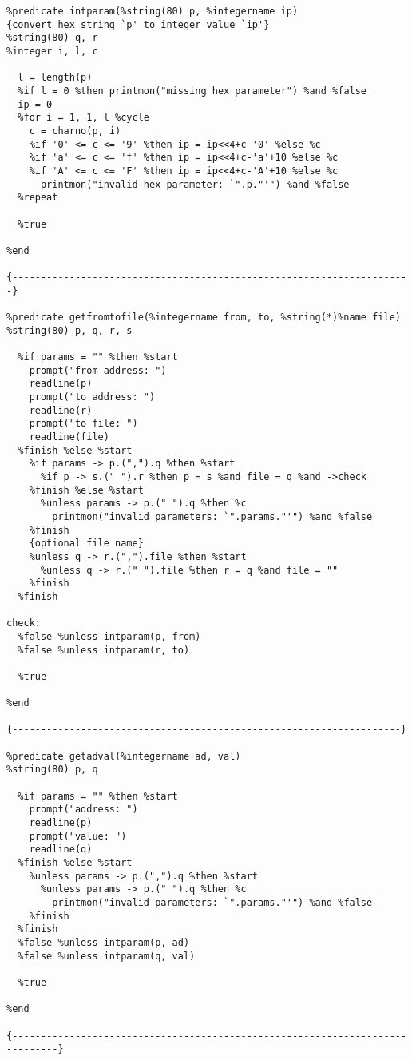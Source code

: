 \begin{verbatim}
%predicate intparam(%string(80) p, %integername ip)
{convert hex string `p' to integer value `ip'}
%string(80) q, r
%integer i, l, c

  l = length(p)
  %if l = 0 %then printmon("missing hex parameter") %and %false
  ip = 0
  %for i = 1, 1, l %cycle
    c = charno(p, i)    
    %if '0' <= c <= '9' %then ip = ip<<4+c-'0' %else %c
    %if 'a' <= c <= 'f' %then ip = ip<<4+c-'a'+10 %else %c
    %if 'A' <= c <= 'F' %then ip = ip<<4+c-'A'+10 %else %c
      printmon("invalid hex parameter: `".p."'") %and %false
  %repeat

  %true

%end

{----------------------------------------------------------------------}

%predicate getfromtofile(%integername from, to, %string(*)%name file)
%string(80) p, q, r, s

  %if params = "" %then %start
    prompt("from address: ")
    readline(p)
    prompt("to address: ")
    readline(r)
    prompt("to file: ")
    readline(file)
  %finish %else %start
    %if params -> p.(",").q %then %start
      %if p -> s.(" ").r %then p = s %and file = q %and ->check
    %finish %else %start
      %unless params -> p.(" ").q %then %c
        printmon("invalid parameters: `".params."'") %and %false
    %finish
    {optional file name}
    %unless q -> r.(",").file %then %start
      %unless q -> r.(" ").file %then r = q %and file = ""
    %finish
  %finish

check:
  %false %unless intparam(p, from)
  %false %unless intparam(r, to)

  %true

%end

{--------------------------------------------------------------------}

%predicate getadval(%integername ad, val)
%string(80) p, q

  %if params = "" %then %start
    prompt("address: ")
    readline(p)
    prompt("value: ")
    readline(q)
  %finish %else %start
    %unless params -> p.(",").q %then %start
      %unless params -> p.(" ").q %then %c
        printmon("invalid parameters: `".params."'") %and %false
    %finish
  %finish
  %false %unless intparam(p, ad)
  %false %unless intparam(q, val)

  %true

%end

{------------------------------------------------------------------------------}


\end{verbatim}
